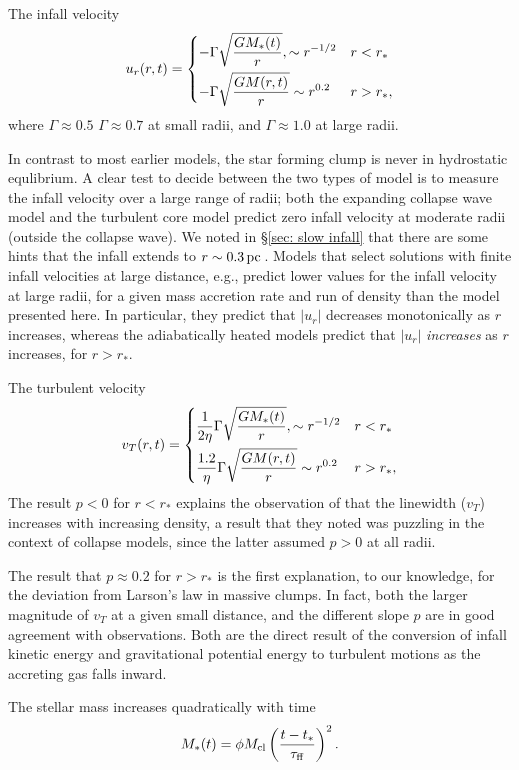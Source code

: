 \documentclass[iop,apj,numberedappendix]{emulateapj}
\newcommand       \phil[1]      {{\color{blue} #1}}
\newcommand       \be		{\begin{equation}}
\newcommand       \ee		{\end{equation}}
\newcommand       \pc		{\,{\rm pc \,}}
\newcommand       \etaeff       {\eta}
\newcommand       \tff          {\tau_{\rm ff}}
\begin{document}
The infall velocity 
%
\be
u_r(r,t)=
\begin{dcases}
-\Gamma\sqrt{GM_*(t)\over r}, \sim r^{-1/2} & r<r_*\\
-\Gamma\sqrt{GM(r,t)\over r} \sim r^{0.2} & r>r_*,
\end{dcases}
\ee
%
where \phil{\sout{$\Gamma\approx 0.5$} $\Gamma \approx 0.7$} at small radii, and $\Gamma\approx 1.0$ at
large radii. 

In contrast to most earlier models, the star forming clump is never in
hydrostatic equlibrium. A clear test to decide between the two types
of model is to measure the infall velocity over a large range of
radii; both the expanding collapse wave model and the turbulent core
model predict zero infall velocity at moderate radii (outside the
collapse wave). We noted in \S \ref{sec: slow infall} that there are some hints
that the infall extends to $r\sim0.3\pc$. Models that select solutions with finite infall
velocities at large distance, e.g., \citet{2004ApJ...615..813F}
predict lower values for the infall velocity at large radii, for a given mass
accretion rate and run of density than the model presented here. In
particular, they predict that $|u_r|$ decreases monotonically as $r$
increases, whereas the adiabatically heated models predict that
$|u_r|$ {\em increases} as $r$ increases, for $r>r_*$.


The turbulent velocity 
%
\be
v_T(r,t)=
\begin{dcases}
{1\over 2\etaeff}\Gamma\sqrt{GM_*(t)\over r}, \sim r^{-1/2} & r<r_*\\
{1.2\over \etaeff}\Gamma\sqrt{GM(r,t)\over r} \sim r^{0.2} & r>r_*,
\end{dcases}
\ee
%
The result $p<0$ for $r<r_*$ explains the observation of
\citet{1997ApJ...476..730P} that the linewidth ($v_T$) increases with
increasing density, a result that they noted was puzzling in the
context of collapse models, since the latter assumed $p>0$ at all radii.

The result that $p\approx0.2$ for $r>r_*$ is the first explanation, to
our knowledge, for the deviation from Larson's law in massive
clumps. In fact, both the larger magnitude of $v_T$ at a given small
distance, and the different slope $p$ are in good agreement with
observations. Both are the direct result of the conversion of infall
kinetic energy and gravitational potential energy to turbulent motions
as the accreting gas falls inward.


The stellar mass increases quadratically with time
%
\be  %
M_*(t)=\phi M_{\rm cl}\left({t-t_*\over \tff}\right)^2.
\ee  %
%
\end{document}
